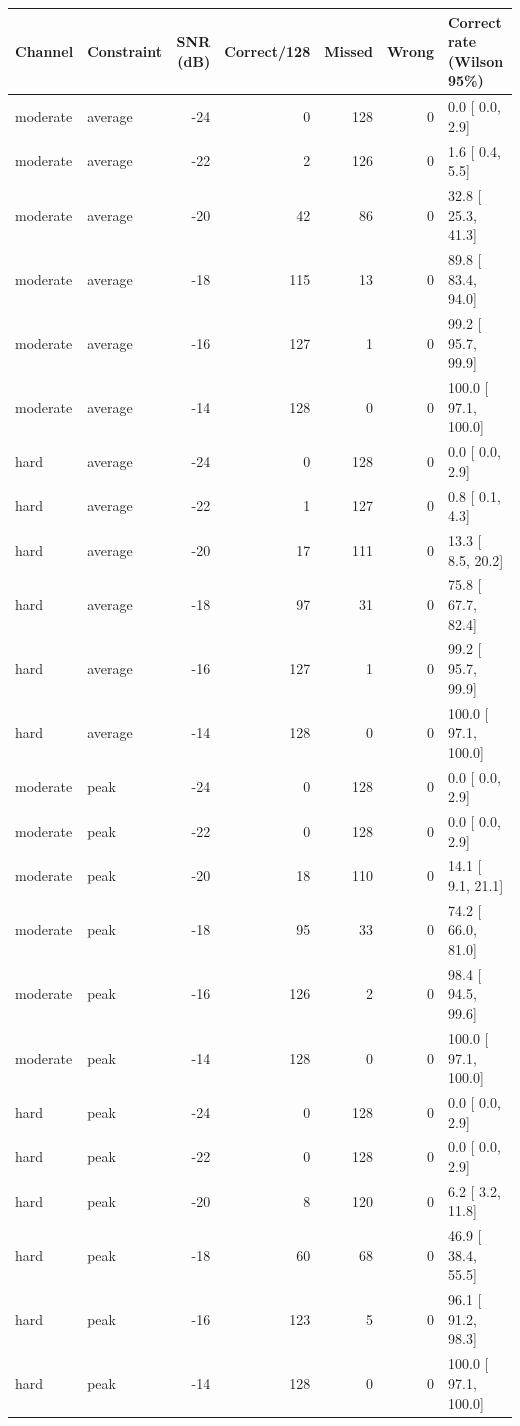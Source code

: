 \begin{tabular}{llrrrrl}
\toprule Channel & Constraint & SNR (dB) & Correct/128 & Missed & Wrong & Correct rate (Wilson 95\%) \\
\midrule
moderate & average & -24 & 0 & 128 & 0 &   0.0 [  0.0,   2.9] \\
moderate & average & -22 & 2 & 126 & 0 &   1.6 [  0.4,   5.5] \\
moderate & average & -20 & 42 & 86 & 0 &  32.8 [ 25.3,  41.3] \\
moderate & average & -18 & 115 & 13 & 0 &  89.8 [ 83.4,  94.0] \\
moderate & average & -16 & 127 & 1 & 0 &  99.2 [ 95.7,  99.9] \\
moderate & average & -14 & 128 & 0 & 0 & 100.0 [ 97.1, 100.0] \\
hard & average & -24 & 0 & 128 & 0 &   0.0 [  0.0,   2.9] \\
hard & average & -22 & 1 & 127 & 0 &   0.8 [  0.1,   4.3] \\
hard & average & -20 & 17 & 111 & 0 &  13.3 [  8.5,  20.2] \\
hard & average & -18 & 97 & 31 & 0 &  75.8 [ 67.7,  82.4] \\
hard & average & -16 & 127 & 1 & 0 &  99.2 [ 95.7,  99.9] \\
hard & average & -14 & 128 & 0 & 0 & 100.0 [ 97.1, 100.0] \\
moderate & peak & -24 & 0 & 128 & 0 &   0.0 [  0.0,   2.9] \\
moderate & peak & -22 & 0 & 128 & 0 &   0.0 [  0.0,   2.9] \\
moderate & peak & -20 & 18 & 110 & 0 &  14.1 [  9.1,  21.1] \\
moderate & peak & -18 & 95 & 33 & 0 &  74.2 [ 66.0,  81.0] \\
moderate & peak & -16 & 126 & 2 & 0 &  98.4 [ 94.5,  99.6] \\
moderate & peak & -14 & 128 & 0 & 0 & 100.0 [ 97.1, 100.0] \\
hard & peak & -24 & 0 & 128 & 0 &   0.0 [  0.0,   2.9] \\
hard & peak & -22 & 0 & 128 & 0 &   0.0 [  0.0,   2.9] \\
hard & peak & -20 & 8 & 120 & 0 &   6.2 [  3.2,  11.8] \\
hard & peak & -18 & 60 & 68 & 0 &  46.9 [ 38.4,  55.5] \\
hard & peak & -16 & 123 & 5 & 0 &  96.1 [ 91.2,  98.3] \\
hard & peak & -14 & 128 & 0 & 0 & 100.0 [ 97.1, 100.0] \\
\bottomrule\end{tabular}
